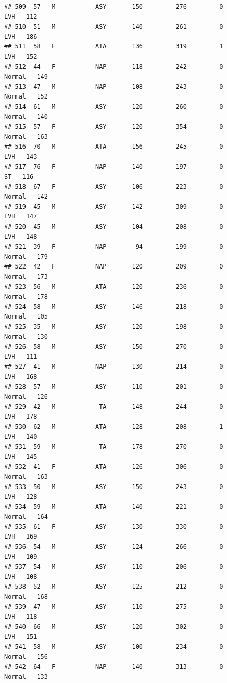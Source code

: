 \documentclass[
]{article}
\begin{document}
\begin{verbatim}
## 509  57   M           ASY       150         276         0        LVH   112
## 510  51   M           ASY       140         261         0        LVH   186
## 511  58   F           ATA       136         319         1        LVH   152
## 512  44   F           NAP       118         242         0     Normal   149
## 513  47   M           NAP       108         243         0     Normal   152
## 514  61   M           ASY       120         260         0     Normal   140
## 515  57   F           ASY       120         354         0     Normal   163
## 516  70   M           ATA       156         245         0        LVH   143
## 517  76   F           NAP       140         197         0         ST   116
## 518  67   F           ASY       106         223         0     Normal   142
## 519  45   M           ASY       142         309         0        LVH   147
## 520  45   M           ASY       104         208         0        LVH   148
## 521  39   F           NAP        94         199         0     Normal   179
## 522  42   F           NAP       120         209         0     Normal   173
## 523  56   M           ATA       120         236         0     Normal   178
## 524  58   M           ASY       146         218         0     Normal   105
## 525  35   M           ASY       120         198         0     Normal   130
## 526  58   M           ASY       150         270         0        LVH   111
## 527  41   M           NAP       130         214         0        LVH   168
## 528  57   M           ASY       110         201         0     Normal   126
## 529  42   M            TA       148         244         0        LVH   178
## 530  62   M           ATA       128         208         1        LVH   140
## 531  59   M            TA       178         270         0        LVH   145
## 532  41   F           ATA       126         306         0     Normal   163
## 533  50   M           ASY       150         243         0        LVH   128
## 534  59   M           ATA       140         221         0     Normal   164
## 535  61   F           ASY       130         330         0        LVH   169
## 536  54   M           ASY       124         266         0        LVH   109
## 537  54   M           ASY       110         206         0        LVH   108
## 538  52   M           ASY       125         212         0     Normal   168
## 539  47   M           ASY       110         275         0        LVH   118
## 540  66   M           ASY       120         302         0        LVH   151
## 541  58   M           ASY       100         234         0     Normal   156
## 542  64   F           NAP       140         313         0     Normal   133

\end{verbatim}
\end{document}
